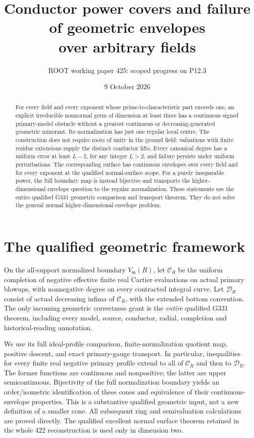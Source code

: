 \documentclass[11pt]{article}
\title{Conductor power covers and failure of geometric envelopes\\
over arbitrary fields}
\author{ROOT working paper 425: scoped progress on P12.3}
\date{9 October 2026}
\newcommand{\m}{\mathfrak m}
\newcommand{\Cc}{\mathcal C}
\newcommand{\Dd}{\mathcal D}
\begin{document}
\maketitle
\begin{abstract}
For every field and every exponent whose prime-to-characteristic part
exceeds one, an explicit irreducible nonnormal germ of dimension at
least three has a continuous signed primary-model obstacle without a
greatest continuous or decreasing-generated geometric minorant.
Its normalization has just one regular local centre. The construction
does not require roots of unity in the ground field: valuations with
finite residue extensions supply the distinct conductor lifts.
Every canonical degree has a uniform error at least $L-2$, for any
integer $L>2$, and failure persists under uniform perturbations.
The corresponding surface has continuous envelopes over every field
and for every exponent at the qualified normal-surface scope.
For a purely inseparable power, the full boundary map is instead
bijective and transports the higher-dimensional envelope question to
the regular normalization. These statements use the entire qualified
G331 geometric comparison and transport theorem. They do not solve
the general normal higher-dimensional envelope problem.
\end{abstract}

\section{The qualified geometric framework}
On the all-support normalized boundary $V_{\m}(R)$, let $\Cc_R$
be the uniform completion of negative effective finite real Cartier
evaluations on actual primary blowups, with nonnegative degree on
every contracted integral curve. Let $\Dd_R$ consist of actual
decreasing infima of $\Cc_R$, with the extended bottom convention.
The only incoming geometric correctness grant is the \emph{entire}
qualified G331 theorem, including every model, source, conductor,
radial, completion and historical-reading annotation.

We use its full ideal-profile comparison, finite-normalization
quotient map, positive descent, and exact primary-gauge transport.
In particular, inequalities for every finite real negative primary
profile extend to all of $\Cc_R$ and then to $\Dd_R$.
The former functions are continuous and nonpositive; the latter
are upper semicontinuous. Bijectivity of the full normalization
boundary yields an order/isometric identification of these cones
and equivalence of their continuous-envelope properties.
This is a substantive qualified geometric input, not a new definition
of a smaller cone. All subsequent ring and semivaluation calculations
are proved directly. The qualified excellent normal surface theorem
retained in the whole 422 reconstruction is used only in dimension two.
\end{document}

